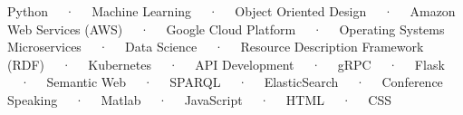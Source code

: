 \begin{cventries}
  \cventry
    {}
    {}
    {}
    {}
    {
    \vspace{-1em}
    \begin{cvitems}
        \item {
            Python ~~·~~  
            Machine Learning ~~·~~ 
            Object Oriented Design ~~·~~ 
            Amazon Web Services (AWS) ~~·~~ 
            Google Cloud Platform ~~·~~ 
            Operating Systems 
            Microservices ~~·~~ 
            Data Science ~~·~~ 
            Resource Description Framework (RDF) ~~·~~ 
            Kubernetes ~~·~~ 
            API Development ~~·~~ 
            gRPC ~~·~~  
            Flask ~~·~~  
            Semantic Web ~~·~~  
            SPARQL ~~·~~  
            ElasticSearch ~~·~~  
            Conference Speaking ~~·~~ 
            Matlab ~~·~~  
            JavaScript ~~·~~  
            HTML ~~·~~  
            CSS
        }
    \end{cvitems}
    }
    
\end{cventries}
